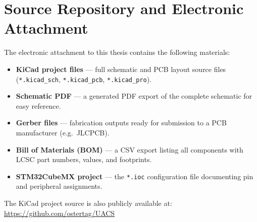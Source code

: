\chapter{Source Repository and Electronic Attachment}

The electronic attachment to this thesis contains the following materials:

\begin{itemize}
  \item \textbf{KiCad project files} --- full schematic and PCB layout source files
        (\texttt{*.kicad\_sch}, \texttt{*.kicad\_pcb}, \texttt{*.kicad\_pro}).
  \item \textbf{Schematic PDF} --- a generated PDF export of the complete schematic for
        easy reference.
  \item \textbf{Gerber files} --- fabrication outputs ready for submission to a PCB
        manufacturer (e.g.\ JLCPCB).
  \item \textbf{Bill of Materials (BOM)} --- a CSV export listing all components with
        LCSC part numbers, values, and footprints.
  \item \textbf{STM32CubeMX project} --- the \texttt{*.ioc} configuration file
        documenting pin and peripheral assignments.
\end{itemize}

The KiCad project source is also publicly available at:
\url{https://github.com/ostertag/UACS}

